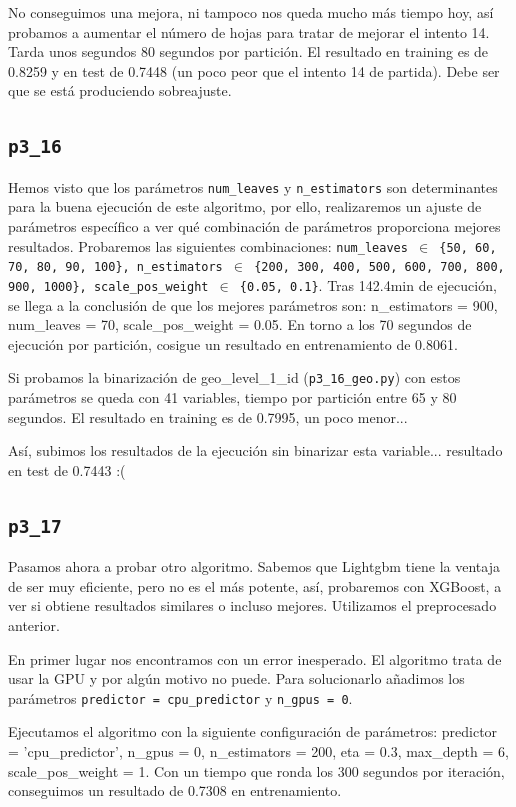 \documentclass[a4paper, 20pt]{article}
\begin{document}
No conseguimos una mejora, ni tampoco nos queda mucho más tiempo hoy, así probamos a aumentar el número de hojas para tratar de mejorar el intento 14. Tarda unos segundos 80 segundos por partición. El resultado en training es de 0.8259 y en test de 0.7448 (un poco peor que el intento 14 de partida). Debe ser que se está produciendo sobreajuste.

\subsection{\texttt{p3\_16}}

Hemos visto que los parámetros \texttt{num\_leaves} y \texttt{n\_estimators} son determinantes para la buena ejecución de este algoritmo, por ello, realizaremos un ajuste de parámetros específico a ver qué combinación de parámetros proporciona mejores resultados. Probaremos las siguientes combinaciones: \texttt{num\_leaves $\in$ \{50, 60, 70, 80, 90, 100\}, n\_estimators $\in$ \{200, 300, 400, 500, 600, 700, 800, 900, 1000\},
  scale\_pos\_weight $\in$ \{0.05, 0.1\}}. Tras  142.4min de ejecución, se llega a la conclusión de que los mejores parámetros son: {\ttfamily n\_estimators = 900, num\_leaves = 70, scale\_pos\_weight = 0.05}. En torno a los 70 segundos de ejecución por partición, cosigue un resultado en entrenamiento de 0.8061.

Si probamos la binarización de geo\_level\_1\_id (\texttt{p3\_16\_geo.py}) con estos parámetros se queda con 41 variables, tiempo por partición entre 65 y 80 segundos. El resultado en training es de 0.7995, un poco menor...

Así, subimos los resultados de la ejecución sin binarizar esta variable... resultado en test de 0.7443 :(

\subsection{\texttt{p3\_17}}

Pasamos ahora a probar otro algoritmo. Sabemos que Lightgbm tiene la ventaja de ser muy eficiente, pero no es el más potente, así, probaremos con XGBoost, a ver si obtiene resultados similares o incluso mejores. Utilizamos el preprocesado anterior.

En primer lugar nos encontramos con un error inesperado. El algoritmo trata de usar la GPU y por algún motivo no puede. Para solucionarlo añadimos los parámetros \texttt{predictor = cpu\_predictor} y \texttt{n\_gpus = 0}.

Ejecutamos el algoritmo con la siguiente configuración de parámetros: {\ttfamily predictor = 'cpu\_predictor', n\_gpus = 0, n\_estimators = 200, eta = 0.3, max\_depth = 6, scale\_pos\_weight = 1}. Con un tiempo que ronda los 300 segundos por iteración, conseguimos un resultado de 0.7308 en entrenamiento.
\end{document}
